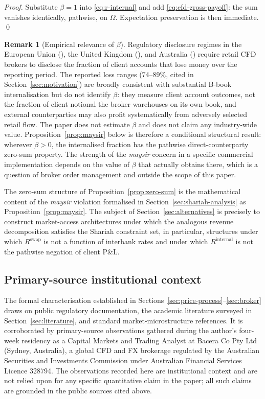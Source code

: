 \documentclass[preprint,12pt,authoryear]{elsarticle}
\theoremstyle{definition}
\newtheorem{remark}{Remark}[section]
\begin{document}
\begin{proof}
Substitute $\beta = 1$ into \eqref{eq:r-internal} and add
\eqref{eq:cfd-gross-payoff}: the sum vanishes identically, pathwise, on
$\Omega$. Expectation preservation is then immediate. \qed
\end{proof}

\begin{remark}[Empirical relevance of $\beta$]
\label{rem:beta-empirical}
Regulatory disclosure regimes in the European Union
(\citealp{ESMA2018}), the United Kingdom (\citealp{FCA2022}), and
Australia (\citealp{ASIC2020}) require retail CFD brokers to disclose
the fraction of client accounts that lose money over the reporting
period. The reported loss ranges (74--89\%, cited in
Section~\ref{sec:motivation}) are broadly consistent with
substantial B-book internalisation but do not identify $\beta$:
they measure client account outcomes, not the fraction of client
notional the broker warehouses on its own book, and external
counterparties may also profit systematically from adversely
selected retail flow. The paper does not estimate $\beta$ and
does not claim any industry-wide value.
Proposition~\ref{prop:maysir} below is therefore a conditional
structural result: wherever $\beta > 0$, the internalised
fraction has the pathwise direct-counterparty zero-sum property.
The strength of the \emph{maysir} concern in a specific
commercial implementation depends on the value of $\beta$ that
actually obtains there, which is a question of broker order
management and outside the scope of this paper.
\end{remark}

The zero-sum structure of Proposition~\ref{prop:zero-sum} is the
mathematical content of the \emph{maysir} violation formalised in
Section~\ref{sec:shariah-analysis} as Proposition~\ref{prop:maysir}.
The subject of Section~\ref{sec:alternatives} is precisely to
construct market-access architectures under which the analogous
revenue decomposition satisfies the Shariah constraint set, in
particular, structures under which $R^{\text{swap}}$ is not a function
of interbank rates and under which $R^{\text{internal}}$ is not the
pathwise negation of client P\&L.

\subsection{Primary-source institutional context}
\label{sec:primary-source}

The formal characterisation established in
Sections~\ref{sec:price-process}--\ref{sec:broker} draws on public
regulatory documentation, the academic literature surveyed in
Section~\ref{sec:literature}, and standard market-microstructure
references. It is corroborated by primary-source observations gathered
during the author's four-week residency as a Capital Markets and
Trading Analyst at Bacera Co Pty Ltd (Sydney, Australia), a global
CFD and FX brokerage regulated by the Australian Securities and
Investments Commission under Australian Financial Services Licence
328794. The observations recorded here are institutional context and
are not relied upon for any specific quantitative claim in the paper;
all such claims are grounded in the public sources cited above.
\end{document}
